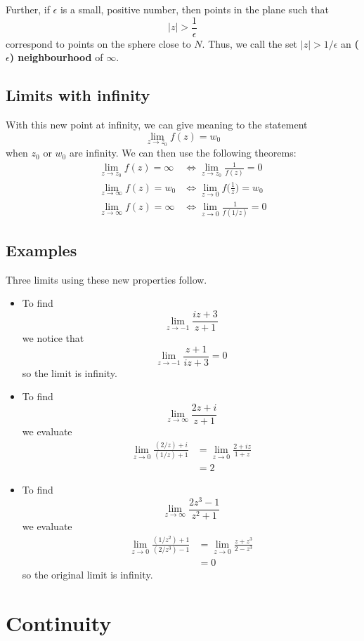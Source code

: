 \documentclass{article}
\renewcommand{\emph}{\textbf}
\begin{document}
Further, if $\epsilon$ is a small, positive number, then points in the plane such that
\[
	|z| > \frac{1}{\epsilon}
\]
correspond to points on the sphere close to $N$. Thus, we call the set $|z| > 1/\epsilon$ an \emph{($\epsilon$) neighbourhood} of $\infty$.

\subsection{Limits with infinity}
With this new point at infinity, we can give meaning to the statement
\[
	\lim_{z \to z_0} f(z) = w_0
\]
when $z_0$ or $w_0$ are infinity. We can then use the following theorems:
\begin{align*}
	\lim_{z \to z_0} f(z) = \infty &\iff \lim_{z \to z_0} \frac{1}{f(z)} = 0 \\
	\lim_{z \to \infty} f(z) = w_0 &\iff \lim_{z \to 0} f\Big(\frac{1}{z}\Big) = w_0 \\
	\lim_{z \to \infty} f(z) = \infty &\iff \lim_{z \to 0} \frac{1}{f(1/z)} = 0
\end{align*}

\subsection{Examples}
Three limits using these new properties follow.
\begin{itemize}
\item To find
\[
	\lim_{z \to -1} \frac{iz + 3}{z + 1}
\]
we notice that
\[
	\lim_{z \to -1} \frac{z + 1}{iz + 3} = 0
\]
so the limit is infinity.

\item To find
\[
	\lim_{z \to \infty} \frac{2z + i}{z + 1}
\]
we evaluate
\begin{align*}
	\lim_{z \to 0} \frac{(2 / z) + i}{(1 / z) + 1} 
	&= \lim_{z \to 0} \frac{2 + iz}{1 + z} \\
	&= 2
\end{align*}

\item To find
\[
	\lim_{z \to \infty} \frac{2z^3 - 1}{z^2 + 1}
\]
we evaluate
\begin{align*}
	\lim_{z \to 0} \frac{(1/z^2) + 1}{(2/z^3) - 1}
	&= \lim_{z \to 0} \frac{z + z^3}{2 - z^3} \\
	&= 0
\end{align*}
so the original limit is infinity.
\end{itemize}


\clearpage
\section{Continuity}
\end{document}
